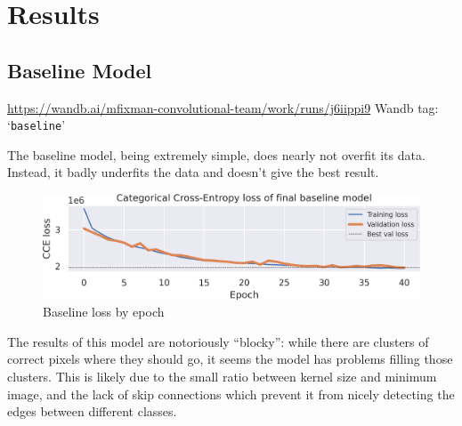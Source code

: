 \section{Results}

\subsection{Baseline Model}
\begin{scriptsize}
	\vspace{-\parskip}
	\url{https://wandb.ai/mfixman-convolutional-team/work/runs/j6iippi9}
	\hfill{} Wandb tag: `\texttt{baseline}'
\end{scriptsize}

The baseline model, being extremely simple, does nearly not overfit its data.
Instead, it badly underfits the data and doesn't give the best result.

\begin{figure}[h]
	\centering
	\includegraphics[width=.9\textwidth]{baseline_loss.png}
	\caption{Baseline loss by epoch}
	\label{baseline_model_loss}
\end{figure}

The results of this model are notoriously ``blocky'': while there are clusters of correct pixels where they should go, it seems the model has problems filling those clusters.
This is likely due to the small ratio between kernel size and minimum image, and the lack of skip connections which prevent it from nicely detecting the edges between different classes.

